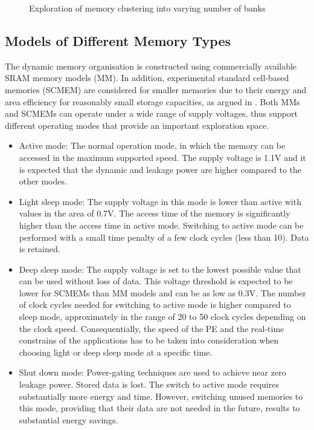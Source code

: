 \documentclass{acm_proc_article-sp}
\begin{document}
\begin{figure}[!t]
\centering
\caption{Exploration of memory clustering into varying number of banks}
\label{fig:platform}
\end{figure}

\subsection{Models of Different Memory Types}
The dynamic memory organisation is constructed using commercially available SRAM memory models (MM). In addition, experimental standard cell-based memories (SCMEM) \cite{Mei11}  are  considered for smaller memories due to their energy and area efficiency for reasonably small storage capacities, as argued in \cite{Mei10}. Both MMs and SCMEMs can operate under a wide range of supply voltages, thus support different operating modes that provide an important exploration space.
\begin{itemize}
\item Active mode: The normal operation mode, in which the memory can be accessed in the maximum supported speed. The supply voltage is 1.1V and it is expected that the dynamic and leakage power are higher compared to the other modes.
\item Light sleep mode: The supply voltage in this mode is lower than active with values in the area of 0.7V. The access time of the memory is significantly higher than the access time in active mode. Switching to active mode can be performed with a small time penalty of a few clock cycles (less than 10). Data is retained.  
\item Deep sleep mode: The supply voltage is set to the lowest possible value that can be used without loss of data. This voltage threshold is expected to be lower for SCMEMs than MM models and can be as low as 0.3V. The number of clock cycles needed for switching to active mode is higher compared to sleep mode, approximately in the range of 20 to 50 clock cycles depending on the clock speed. Consequentially, the speed of the PE and the real-time constrains of the applications has to be taken into consideration when choosing light or deep sleep mode at a specific time.  
\item Shut down mode: Power-gating techniques are used to achieve near zero leakage power. Stored data is lost. The switch to active mode requires substantially more energy and time. However, switching unused memories to this mode, providing that their data are not needed in the future, results to substantial energy savings.
\end{itemize}  
\end{document}

